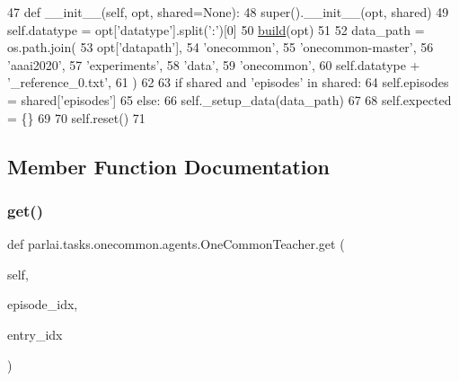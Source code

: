 \begin{DoxyCode}
47     \textcolor{keyword}{def }\_\_init\_\_(self, opt, shared=None):
48         super().\_\_init\_\_(opt, shared)
49         self.datatype = opt[\textcolor{stringliteral}{'datatype'}].split(\textcolor{stringliteral}{':'})[0]
50         \hyperlink{namespaceparlai_1_1mturk_1_1tasks_1_1talkthewalk_1_1download_a8c0fbb9b6dfe127cb8c1bd6e7c4e33fd}{build}(opt)
51 
52         data\_path = os.path.join(
53             opt[\textcolor{stringliteral}{'datapath'}],
54             \textcolor{stringliteral}{'onecommon'},
55             \textcolor{stringliteral}{'onecommon-master'},
56             \textcolor{stringliteral}{'aaai2020'},
57             \textcolor{stringliteral}{'experiments'},
58             \textcolor{stringliteral}{'data'},
59             \textcolor{stringliteral}{'onecommon'},
60             self.datatype + \textcolor{stringliteral}{'\_reference\_0.txt'},
61         )
62 
63         \textcolor{keywordflow}{if} shared \textcolor{keywordflow}{and} \textcolor{stringliteral}{'episodes'} \textcolor{keywordflow}{in} shared:
64             self.episodes = shared[\textcolor{stringliteral}{'episodes'}]
65         \textcolor{keywordflow}{else}:
66             self.\_setup\_data(data\_path)
67 
68         self.expected = \{\}
69 
70         self.reset()
71 
\end{DoxyCode}


\subsection{Member Function Documentation}
\mbox{\label{classparlai_1_1tasks_1_1onecommon_1_1agents_1_1OneCommonTeacher_add4f390c9e8aad4a140d560c80db87c1}} 
\subsubsection{\texorpdfstring{get()}{get()}}
{\footnotesize\ttfamily def parlai.\+tasks.\+onecommon.\+agents.\+One\+Common\+Teacher.\+get (\begin{DoxyParamCaption}\item[{}]{self,  }\item[{}]{episode\+\_\+idx,  }\item[{}]{entry\+\_\+idx }\end{DoxyParamCaption})}



